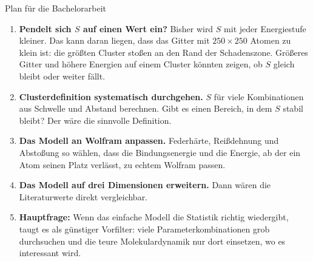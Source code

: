 \documentclass[aspectratio=169,11pt]{beamer}
\begin{document}
\begin{frame}{Plan für die Bachelorarbeit}
  \leavevmode
  \vspace{0.2em}
  {\footnotesize
  \begin{enumerate}
    \item \textbf{Pendelt sich $S$ auf einen Wert ein?} Bisher wird $S$ mit
      jeder Energiestufe kleiner. Das kann daran liegen, dass das Gitter mit
      $250\times250$ Atomen \alert{zu klein} ist: die größten Cluster stoßen
      an den Rand der Schadenszone. Größeres Gitter und höhere Energien
      auf einem Cluster könnten zeigen, ob $S$ gleich bleibt oder weiter fällt.
    \item \textbf{Clusterdefinition systematisch durchgehen.} $S$ für viele
      Kombinationen aus Schwelle und Abstand berechnen. Gibt es einen Bereich,
      in dem $S$ stabil bleibt? Der wäre die sinnvolle Definition.
    \item \textbf{Das Modell an Wolfram anpassen.} Federhärte, Reißdehnung und
      Abstoßung so wählen, dass die Bindungsenergie und die Energie, ab der ein
      Atom seinen Platz verlässt, zu echtem Wolfram passen.
    \item \textbf{Das Modell auf drei Dimensionen erweitern.} Dann wären die
      Literaturwerte direkt vergleichbar.
    \item \textbf{Hauptfrage:} Wenn das einfache Modell die Statistik richtig
      wiedergibt, taugt es als günstiger Vorfilter: viele
      Parameterkombinationen grob durchsuchen und die teure Molekulardynamik
      nur dort einsetzen, wo es interessant wird.
  \end{enumerate}}
\end{frame}


\appendix
\end{document}
